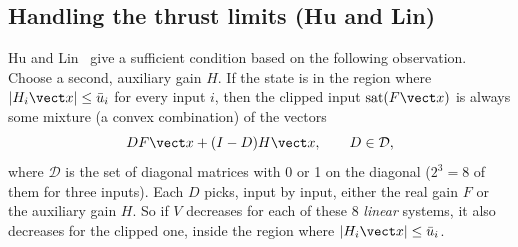 \subsection{Handling the thrust limits (Hu and Lin)}
Hu and Lin~\cite{hu2001saturation} give a sufficient condition based on the following observation. Choose a second, auxiliary gain $H$. If the state is in the region where $|H_i\vect x|\le\bar u_i$ for every input $i$, then the clipped input $\operatorname{sat}(F\vect x)$ is always some mixture (a convex combination) of the vectors
\begin{equation}
  D F\vect x + (I - D)H\vect x, \qquad D \in\mathcal D,
\end{equation}
where $\mathcal D$ is the set of diagonal matrices with 0 or 1 on the diagonal ($2^3 = 8$ of them for three inputs). Each $D$ picks, input by input, either the real gain $F$ or the auxiliary gain $H$. So if $V$ decreases for each of these 8 \emph{linear} systems, it also decreases for the clipped one, inside the region where $|H_i\vect x|\le\bar u_i$.

